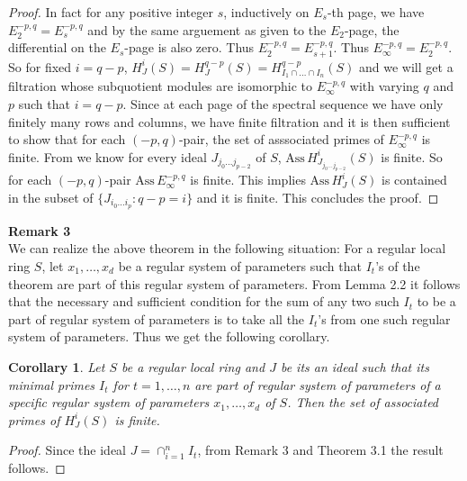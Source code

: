 \documentclass[10pt]{amsart}
\theoremstyle{plain}
\newtheorem{cor}{Corollary}
\theoremstyle{definition}
\newcommand{\func}[1]{\mathrm{#1} \,}
\newcommand{\Ass}{\func{Ass}}
\begin{document}
\begin{proof}
In fact for any positive integer $s$, inductively on $E_s$-th page, we have $E_{2}^{-p,q}= E_s^{-p,q}$ and by the same arguement as given to the $E_2$-page, the differential on the $E_s$-page is also zero. Thus $E_{2}^{-p,q}= E_{s+1}^{-p,q}$. Thus $E_{\infty}^{-p,q}= E_2^{-p,q}$. So for fixed $i=q-p$, $H^{i}_{J}(S)= H^{q-p}_{J}(S)= H^{q-p}_{I_1\cap\dots\cap I_n}(S)$ and we will get a filtration whose subquotient modules are isomorphic to $E_{\infty}^{-p,q}$ with varying $q$ and $p$ such that $i=q-p$. Since at each page of the spectral sequence we have only finitely many rows and columns, we have finite filtration and it is then sufficient to show that for each $(-p,q)$-pair, the set of asssociated primes of $E_{\infty}^{-p,q}$ is finite. From \cite{Mar} we know for every ideal $J_{j_0\ldots j_{p-2}}$ of $S$, $\Ass H^i_{J_{j_0\ldots j_{p-2}}}(S)$ is finite. So for each $(-p,q)$-pair $\Ass E_{\infty}^{-p,q}$ is finite. This implies $\Ass H^i_{J}(S)$ is contained in the subset of $\{J_{i_0\ldots i_p}:q-p=i\}$ and it is finite. This concludes the proof. 
\end{proof}

{\bf Remark 3}\\

We can realize the above theorem in the following situation: For a regular local ring $S$, let $x_1,\dots,x_d$ be a regular system of parameters such that $I_t$'s of the theorem are part of this regular system of parameters. From Lemma 2.2 it follows that the necessary and sufficient condition for the sum of any two such $I_t$ to be a part of regular system of parameters is to take all the $I_t$'s from one such regular system of parameters. Thus we get the following corollary.

\begin{cor}
Let $S$ be a regular local ring and $J$ be its an ideal such that its minimal primes $I_t$ for $t=1,\ldots, n$ are part of regular system of parameters of a specific regular system of parameters $x_{1},\dots,x_{d}$ of $S$. Then the set of associated primes of $H^i_{J}(S)$ is finite.
\end{cor}

\begin{proof}
Since the ideal $J=\cap^n_{i=1}I_t$, from Remark 3 and Theorem 3.1 the result follows.
\end{proof}
\end{document}
